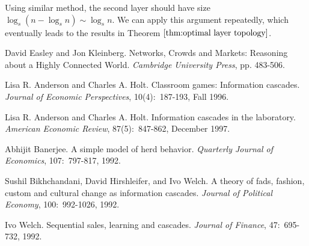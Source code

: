 \documentclass[a4paper,UKenglish]{lipics}
\theoremstyle{definition}
\begin{document}
Using similar method, the second layer should have size $\log_s ( n - \log_s n) \sim \log_s n$.
We can apply this argument repeatedly, which eventually leads to the results in Theorem $\ref{thm:optimal layer topology}$.




%


\nocite{Simpson}

\begin{thebibliography}{99}

David Easley and Jon Kleinberg. Networks, Crowds and Markets: Reasoning about a Highly Connected World. {\em Cambridge University Press}, pp. 483-506.

Lisa R. Anderson and Charles A. Holt. Classroom games: Information cascades. {\em Journal of Economic Perspectives}, 10(4):~187-193, Fall 1996.

Lisa R. Anderson and Charles A. Holt. Information cascades in the laboratory. {\em American Economic Review}, 87(5):~847-862, December 1997.

Abhijit Banerjee. A simple model of herd behavior. {\em Quarterly Journal of Economics}, 107:~797-817, 1992.

Sushil Bikhchandani, David Hirshleifer, and Ivo Welch. A theory of fads, fashion, custom and cultural change as information cascades. {\em Journal of Political Economy}, 100:~992-1026, 1992.

Ivo Welch. Sequential sales, learning and cascades. {\em Journal of Finance}, 47:~695-732, 1992.

\end{thebibliography}
\end{document}
